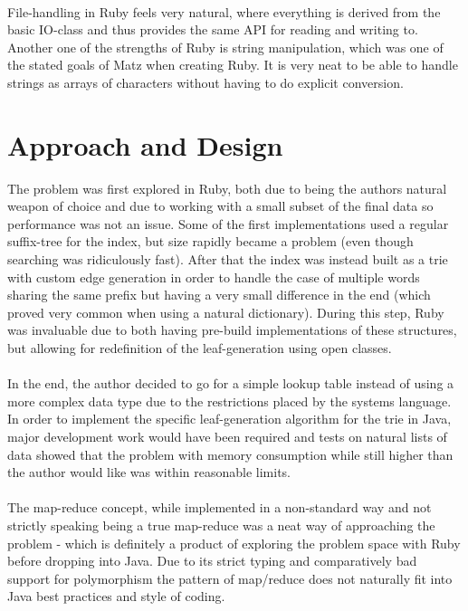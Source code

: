 \documentclass[a4paper,10pt]{article}
\begin{document}
\paragraph{}
File-handling in Ruby feels very natural, where everything is derived from the basic IO-class and thus provides the same API for reading and writing to. Another one of the strengths of Ruby is string manipulation, which was one of the stated goals of Matz when creating Ruby. It is very neat to be able to handle strings as arrays of characters without having to do explicit conversion.

\section{Approach and Design}
The problem was first explored in Ruby, both due to being the authors natural weapon of choice and due to working with a small subset of the final data so performance was not an issue. Some of the first implementations used a regular suffix-tree for the index, but size rapidly became a problem (even though searching was ridiculously fast). After that the index was instead built as a trie with custom edge generation in order to handle the case of multiple words sharing the same prefix but having a very small difference in the end (which proved very common when using a natural dictionary). During this step, Ruby was invaluable due to both having pre-build implementations of these structures, but allowing for redefinition of the leaf-generation using open classes. 
\paragraph{}
In the end, the author decided to go for a simple lookup table instead of using a more complex data type due to the restrictions placed by the systems language. In order to implement the specific leaf-generation algorithm for the trie in Java, major development work would have been required and tests on natural lists of data showed that the problem with memory consumption while still higher than the author would like was within reasonable limits. 
\paragraph{}
The map-reduce concept, while implemented in a non-standard way and not strictly speaking being a true map-reduce was a neat way of approaching the problem - which is definitely a product of exploring the problem space with Ruby before dropping into Java. Due to its strict typing and comparatively bad support for polymorphism the pattern of map/reduce does not naturally fit into Java best practices and style of coding.
\end{document}
